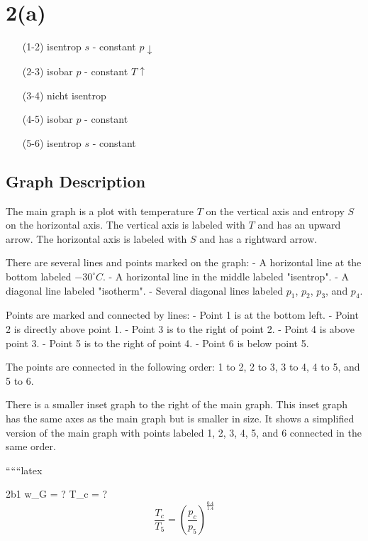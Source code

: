 \section*{2(a)}

\begin{itemize}
    \item[(1-2)] isentrop \quad $s$ - constant \quad $p \downarrow$
    \item[(2-3)] isobar \quad $p$ - constant \quad $T \uparrow$
    \item[(3-4)] nicht isentrop
    \item[(4-5)] isobar \quad $p$ - constant
    \item[(5-6)] isentrop \quad $s$ - constant
\end{itemize}

\subsection*{Graph Description}

The main graph is a plot with temperature $T$ on the vertical axis and entropy $S$ on the horizontal axis. The vertical axis is labeled with $T$ and has an upward arrow. The horizontal axis is labeled with $S$ and has a rightward arrow. 

There are several lines and points marked on the graph:
- A horizontal line at the bottom labeled $-30^\circ C$.
- A horizontal line in the middle labeled "isentrop".
- A diagonal line labeled "isotherm".
- Several diagonal lines labeled $p_1$, $p_2$, $p_3$, and $p_4$.

Points are marked and connected by lines:
- Point 1 is at the bottom left.
- Point 2 is directly above point 1.
- Point 3 is to the right of point 2.
- Point 4 is above point 3.
- Point 5 is to the right of point 4.
- Point 6 is below point 5.

The points are connected in the following order: 1 to 2, 2 to 3, 3 to 4, 4 to 5, and 5 to 6.

There is a smaller inset graph to the right of the main graph. This inset graph has the same axes as the main graph but is smaller in size. It shows a simplified version of the main graph with points labeled 1, 2, 3, 4, 5, and 6 connected in the same order.

``````latex

2b1 \quad w_G = ? \quad T_c = ? \\

\[
\frac{T_c}{T_5} = \left( \frac{p_c}{p_5} \right)^{\frac{0.4}{1.4}}
\]


